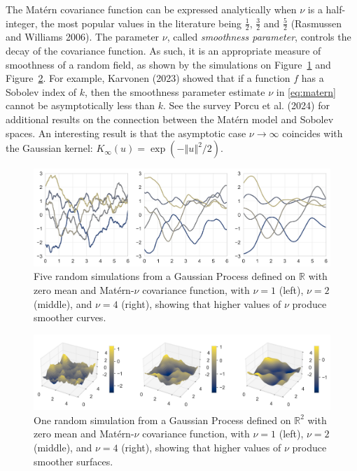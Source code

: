 \documentclass[
  12pt,
]{interact}
\theoremstyle{plain}
\begin{document}
The Matérn covariance function can be expressed analytically when
\(\nu\) is a half-integer, the most popular values in the literature
being \(\frac{1}{2}\), \(\frac{3}{2}\) and \(\frac{5}{2}\) (Rasmussen
and Williams 2006). The parameter \(\nu\), called \emph{smoothness
parameter}, controls the decay of the covariance function. As such, it
is an appropriate measure of smoothness of a random field, as shown by
the simulations on Figure~\ref{fig-matern-1d} and
Figure~\ref{fig-matern-2d}. For example, Karvonen (2023) showed that if
a function \(f\) has a Sobolev index of \(k\), then the smoothness
parameter estimate \(\nu\) in \eqref{eq:matern} cannot be asymptotically
less than \(k\). See the survey Porcu et al. (2024) for additional
results on the connection between the Matérn model and Sobolev spaces.
An interesting result is that the asymptotic case
\(\nu\rightarrow\infty\) coincides with the Gaussian kernel:
\(K_\infty(u)=\exp(-{\left\Vert u\right\Vert}^{2}/2)\).

\begin{figure}

{\centering \includegraphics[width=1\textwidth,height=\textheight]{figures/matern_simulation_1d.png}

}

\caption{\label{fig-matern-1d}Five random simulations from a Gaussian
Process defined on \(\mathbb{R}\) with zero mean and Matérn-\(\nu\)
covariance function, with \(\nu=1\) (left), \(\nu=2\) (middle), and
\(\nu=4\) (right), showing that higher values of \(\nu\) produce
smoother curves.}

\end{figure}

\begin{figure}

{\centering \includegraphics[width=1\textwidth,height=\textheight]{figures/matern_simulation_2d.png}

}

\caption{\label{fig-matern-2d}One random simulation from a Gaussian
Process defined on \(\mathbb{R}^2\) with zero mean and Matérn-\(\nu\)
covariance function, with \(\nu=1\) (left), \(\nu=2\) (middle), and
\(\nu=4\) (right), showing that higher values of \(\nu\) produce
smoother surfaces.}

\end{figure}
\end{document}
